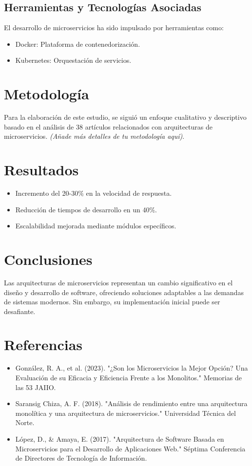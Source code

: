 \documentclass[12pt]{article}
\begin{document}
\subsection{Herramientas y Tecnologías Asociadas}
El desarrollo de microservicios ha sido impulsado por herramientas como:
\begin{itemize}
    \item Docker: Plataforma de contenedorización.
    \item Kubernetes: Orquestación de servicios.
\end{itemize}

\section{Metodología}
Para la elaboración de este estudio, se siguió un enfoque cualitativo y descriptivo basado en el análisis de 38 artículos relacionados con arquitecturas de microservicios. \textit{(Añade más detalles de tu metodología aquí)}.

\section{Resultados}
\begin{itemize}
    \item Incremento del 20-30\% en la velocidad de respuesta.
    \item Reducción de tiempos de desarrollo en un 40\%.
    \item Escalabilidad mejorada mediante módulos específicos.
\end{itemize}

\section{Conclusiones}
Las arquitecturas de microservicios representan un cambio significativo en el diseño y desarrollo de software, ofreciendo soluciones adaptables a las demandas de sistemas modernos. Sin embargo, su implementación inicial puede ser desafiante.

\section*{Referencias}
\begin{itemize}
    \item González, R. A., et al. (2023). "¿Son los Microservicios la Mejor Opción? Una Evaluación de su Eficacia y Eficiencia Frente a los Monolitos." Memorias de las 53 JAIIO.
    \item Saransig Chiza, A. F. (2018). "Análisis de rendimiento entre una arquitectura monolítica y una arquitectura de microservicios." Universidad Técnica del Norte.
    \item López, D., \& Amaya, E. (2017). "Arquitectura de Software Basada en Microservicios para el Desarrollo de Aplicaciones Web." Séptima Conferencia de Directores de Tecnología de Información.
\end{itemize}
\end{document}

